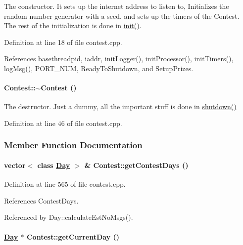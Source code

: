 The constructor. It sets up the internet address to listen to, Initializes the random number generator with a seed, and sets up the timers of the Contest. The rest of the initialization is done in \hyperlink{classContest_Contesta2}{init()}. 

Definition at line 18 of file contest.cpp.

References basethreadpid, iaddr, init\-Logger(), init\-Processor(), init\-Timers(), log\-Msg(), PORT\_\-NUM, Ready\-To\-Shutdown, and Setup\-Prizes.\hypertarget{classContest_Contesta1}{
\paragraph[$\sim$Contest]{\setlength{\rightskip}{0pt plus 5cm}Contest::$\sim$Contest ()}\hfill}
\label{classContest_Contesta1}


The destructor. Just a dummy, all the important stuff is done in \hyperlink{classContest_Contesta3}{shutdown()} 

Definition at line 46 of file contest.cpp.

\subsubsection{Member Function Documentation}
\hypertarget{classContest_Contesta17}{
\paragraph[getContestDays]{\setlength{\rightskip}{0pt plus 5cm}vector$<$ class \hyperlink{classDay}{Day} $>$ \& Contest::get\-Contest\-Days ()}\hfill}
\label{classContest_Contesta17}




Definition at line 565 of file contest.cpp.

References Contest\-Days.

Referenced by Day::calculate\-Est\-No\-Msgs().\hypertarget{classContest_Contesta15}{
\paragraph[getCurrentDay]{\setlength{\rightskip}{0pt plus 5cm}\hyperlink{classDay}{Day} $\ast$ Contest::get\-Current\-Day ()}\hfill}
\label{classContest_Contesta15}



